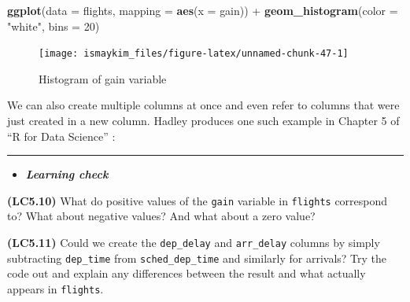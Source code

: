 \documentclass[]{tufte-book}
\newenvironment{Shaded}{\begin{snugshade}}{\end{snugshade}}
\newcommand{\KeywordTok}[1]{\textcolor[rgb]{0.13,0.29,0.53}{\textbf{{#1}}}}
\newcommand{\DataTypeTok}[1]{\textcolor[rgb]{0.13,0.29,0.53}{{#1}}}
\newcommand{\DecValTok}[1]{\textcolor[rgb]{0.00,0.00,0.81}{{#1}}}
\newcommand{\StringTok}[1]{\textcolor[rgb]{0.31,0.60,0.02}{{#1}}}
\newcommand{\NormalTok}[1]{{#1}}
\let\oldrule=\rule
\renewcommand{\rule}[1]{\oldrule{\linewidth}}
\newenvironment{rmdblock}[1]
  {\begin{shaded*}
  \begin{itemize}
  \renewcommand{\labelitemi}{
    \raisebox{-.7\height}[0pt][0pt]{
    }
  }
  \item
  }
  {
  \end{itemize}
  \end{shaded*}
  }
\newenvironment{learncheck}
  {\begin{rmdblock}{warning}}
  {\end{rmdblock}}
\begin{document}
\begin{Shaded}
\begin{Highlighting}[]
\KeywordTok{ggplot}\NormalTok{(}\DataTypeTok{data =} \NormalTok{flights, }\DataTypeTok{mapping =} \KeywordTok{aes}\NormalTok{(}\DataTypeTok{x =} \NormalTok{gain)) +}
\StringTok{  }\KeywordTok{geom_histogram}\NormalTok{(}\DataTypeTok{color =} \StringTok{"white"}\NormalTok{, }\DataTypeTok{bins =} \DecValTok{20}\NormalTok{)}
\end{Highlighting}
\end{Shaded}

\begin{figure}

{\centering \texttt{[image: ismaykim\_files/figure-latex/unnamed-chunk-47-1]} 

}

\caption[Histogram of gain variable]{Histogram of gain variable}\label{fig:unnamed-chunk-47}
\end{figure}

We can also create multiple columns at once and even refer to columns
that were just created in a new column. Hadley produces one such example
in Chapter 5 of ``R for Data Science'' \citep{rds2016}:

\begin{Shaded}
\end{Shaded}

\begin{center}\rule{0.5\linewidth}{\linethickness}\end{center}

\begin{learncheck}
\textbf{\emph{Learning check}}
\end{learncheck}

\textbf{(LC5.10)} What do positive values of the \texttt{gain} variable
in \texttt{flights} correspond to? What about negative values? And what
about a zero value?

\textbf{(LC5.11)} Could we create the \texttt{dep\_delay} and
\texttt{arr\_delay} columns by simply subtracting \texttt{dep\_time}
from \texttt{sched\_dep\_time} and similarly for arrivals? Try the code
out and explain any differences between the result and what actually
appears in \texttt{flights}.
\end{document}
